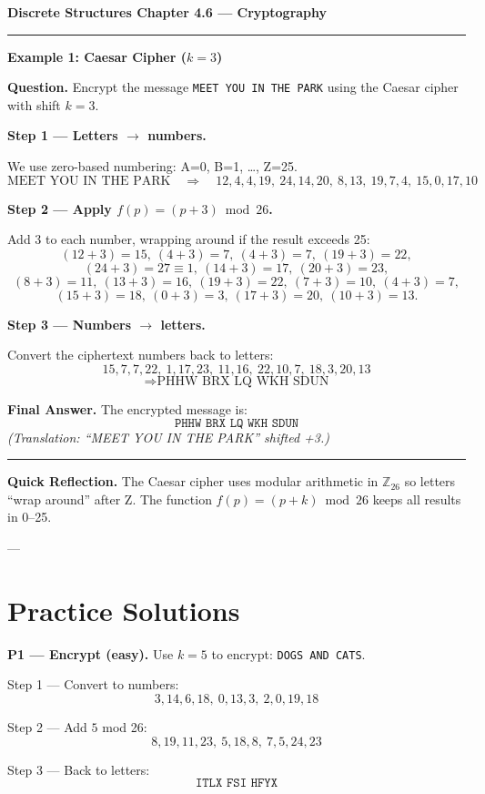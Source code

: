 \documentclass[12pt]{article}
\begin{document}
{\large \textbf{Discrete Structures \quad Chapter 4.6 — Cryptography}}

\hrule
\vspace{0.6em}

\textbf{Example 1: Caesar Cipher ($k=3$)}

\textbf{Question.}  
Encrypt the message \texttt{MEET YOU IN THE PARK} using the Caesar cipher with shift $k=3$.

\textbf{Step 1 — Letters $\rightarrow$ numbers.}

We use zero-based numbering: A=0, B=1, …, Z=25.  
\[
\text{MEET YOU IN THE PARK} \quad \Rightarrow \quad 
12, 4, 4, 19, \ 24, 14, 20, \ 8, 13, \ 19, 7, 4, \ 15, 0, 17, 10
\]

\textbf{Step 2 — Apply $f(p) = (p+3) \bmod 26$.}

Add 3 to each number, wrapping around if the result exceeds 25:
\[
(12+3)=15, \ (4+3)=7, \ (4+3)=7, \ (19+3)=22,
\]
\[
(24+3)=27 \equiv 1,\ (14+3)=17,\ (20+3)=23,
\]
\[
(8+3)=11,\ (13+3)=16,\ (19+3)=22,\ (7+3)=10,\ (4+3)=7,
\]
\[
(15+3)=18,\ (0+3)=3,\ (17+3)=20,\ (10+3)=13.
\]

\textbf{Step 3 — Numbers $\rightarrow$ letters.}

Convert the ciphertext numbers back to letters:
\[
15,7,7,22,\ 1,17,23,\ 11,16,\ 22,10,7,\ 18,3,20,13
\]
\[
\Rightarrow \text{PHHW BRX LQ WKH SDUN}
\]

\textbf{Final Answer.}  
The encrypted message is:
\[
\boxed{\texttt{PHHW BRX LQ WKH SDUN}}
\]
\emph{(Translation: “MEET YOU IN THE PARK” shifted +3.)}

\hrule
\vspace{1em}

\textbf{Quick Reflection.}  
The Caesar cipher uses modular arithmetic in $\mathbb{Z}_{26}$ so letters “wrap around” after Z. The function $f(p)=(p+k)\bmod 26$ keeps all results in 0–25.

---

\section*{Practice Solutions}

\textbf{P1 — Encrypt (easy).}  
Use $k=5$ to encrypt: \texttt{DOGS AND CATS}.

Step 1 — Convert to numbers:
\[
3,14,6,18,\ 0,13,3,\ 2,0,19,18
\]

Step 2 — Add $5$ mod 26:
\[
8,19,11,23,\ 5,18,8,\ 7,5,24,23
\]

Step 3 — Back to letters:
\[
\boxed{\texttt{ITLX FSI HFYX}}
\]
\end{document}
